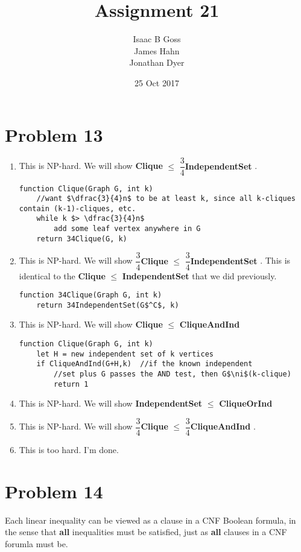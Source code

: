 \documentclass{article}
\author{Isaac B Goss\\ James Hahn\\ Jonathan Dyer}
\title{Assignment 21}
\date{25 Oct 2017}
\providecommand{\prob}[1]{\section*{Problem #1}}
\providecommand{\reducible}[2]{
  \textbf{#1} $\leq$ \textbf{#2}
}
\begin{document}
\maketitle

\prob{13}
\begin{enumerate}[label=(\alph*)]
  \item This is NP-hard. We will show \reducible{Clique}{$\dfrac{3}{4}$IndependentSet}.
  \begin{lstlisting}
function Clique(Graph G, int k)
    //want $\dfrac{3}{4}n$ to be at least k, since all k-cliques contain (k-1)-cliques, etc.
    while k $> \dfrac{3}{4}n$
        add some leaf vertex anywhere in G
    return 34Clique(G, k)
  \end{lstlisting}

  \item This is NP-hard. We will show \reducible{$\dfrac{3}{4}$Clique}{$\dfrac{3}{4}$IndependentSet}. This is identical to the \reducible{Clique}{IndependentSet} that we did previously.
  \begin{lstlisting}
function 34Clique(Graph G, int k)
    return 34IndependentSet(G$^C$, k)
  \end{lstlisting}

  \item This is NP-hard. We will show \reducible{Clique}{CliqueAndInd}
  \begin{lstlisting}
function Clique(Graph G, int k)
    let H = new independent set of k vertices
    if CliqueAndInd(G+H,k)  //if the known independent 
        //set plus G passes the AND test, then G$\ni$(k-clique)
        return 1
  \end{lstlisting}

  \item This is NP-hard. We will show \reducible{IndependentSet}{CliqueOrInd}

  \item This is NP-hard. We will show \reducible{$\dfrac{3}{4}$Clique}{$\dfrac{3}{4}$CliqueAndInd}.

  \item This is too hard. I'm done.
\end{enumerate}


\prob{14}
Each linear inequality can be viewed as a clause in a CNF Boolean formula, 
in the sense that \textbf{all} inequalities must be satisfied, just as \textbf{all} clauses in a CNF forumla must be.
\end{document}
